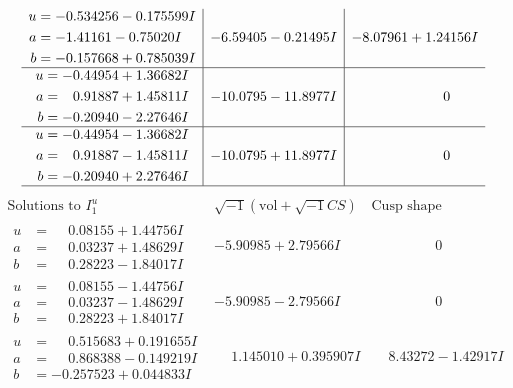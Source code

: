 \documentclass[1p]{elsarticle_modified}
\theoremstyle{definition}
\newcommand{\I}{\sqrt{-1}}
\begin{document}
$$\begin{array}{c|c|c}
\begin{aligned}
u &= -0.534256 - 0.175599 I \\
a &= -1.41161 - 0.75020 I \\
b &= -0.157668 + 0.785039 I\end{aligned}
 & -6.59405 - 0.21495 I & -8.07961 + 1.24156 I \\ \hline\begin{aligned}
u &= -0.44954 + 1.36682 I \\
a &= \phantom{-}0.91887 + 1.45811 I \\
b &= -0.20940 - 2.27646 I\end{aligned}
 & -10.0795 - 11.8977 I & \phantom{-0.000000 } 0 \\ \hline\begin{aligned}
u &= -0.44954 - 1.36682 I \\
a &= \phantom{-}0.91887 - 1.45811 I \\
b &= -0.20940 + 2.27646 I\end{aligned}
 & -10.0795 + 11.8977 I & \phantom{-0.000000 } 0\\
 \hline 
 \end{array}$$\newpage$$\begin{array}{c|c|c}  
\text{Solutions to }I^u_{1}& \I (\text{vol} + \sqrt{-1}CS) & \text{Cusp shape}\\
 \hline 
\begin{aligned}
u &= \phantom{-}0.08155 + 1.44756 I \\
a &= \phantom{-}0.03237 + 1.48629 I \\
b &= \phantom{-}0.28223 - 1.84017 I\end{aligned}
 & -5.90985 + 2.79566 I & \phantom{-0.000000 } 0 \\ \hline\begin{aligned}
u &= \phantom{-}0.08155 - 1.44756 I \\
a &= \phantom{-}0.03237 - 1.48629 I \\
b &= \phantom{-}0.28223 + 1.84017 I\end{aligned}
 & -5.90985 - 2.79566 I & \phantom{-0.000000 } 0 \\ \hline\begin{aligned}
u &= \phantom{-}0.515683 + 0.191655 I \\
a &= \phantom{-}0.868388 - 0.149219 I \\
b &= -0.257523 + 0.044833 I\end{aligned}
 & \phantom{-}1.145010 + 0.395907 I & \phantom{-}8.43272 - 1.42917 I \\ \hline\begin{aligned}

\end{aligned}
\end{array}$$
\end{document}
